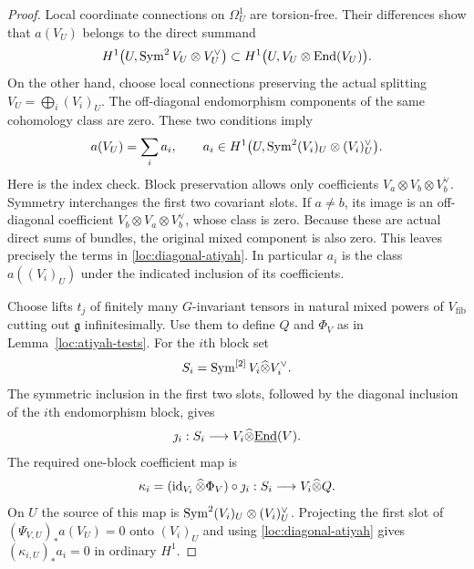 \begin{proof}
Local coordinate connections on $\Omega_U^1$ are torsion-free.
Their differences show that $a(V_U)$ belongs to the direct summand
\[
 H^1\bigl(U,\operatorname{Sym}^2V_U\otimes V_U^\vee\bigr)
       \subset H^1\bigl(U,V_U\otimes\operatorname{End}(V_U)\bigr).
\]
On the other hand, choose local connections preserving the actual
splitting $V_U=\bigoplus_i(V_i)_U$.  The off-diagonal
endomorphism components of the same cohomology class are zero.
These two conditions imply
\begin{equation}
 a(V_U)=\sum_i a_i,\qquad
 a_i\in H^1\bigl(U,\operatorname{Sym}^2(V_i)_U\otimes(V_i)_U^\vee\bigr).
 \label{loc:diagonal-atiyah}
\end{equation}
Here is the index check.  Block preservation allows only
coefficients $V_a\otimes V_b\otimes V_b^\vee$.  Symmetry
interchanges the first two covariant slots.  If $a\ne b$, its
image is an off-diagonal coefficient
$V_b\otimes V_a\otimes V_b^\vee$, whose class is zero.
Because these are actual direct sums of bundles, the original
mixed component is also zero.  This leaves precisely the terms in
\eqref{loc:diagonal-atiyah}.  In particular $a_i$ is the class
$a((V_i)_U)$ under the indicated inclusion of its coefficients.

Choose lifts $t_j$ of finitely many $G$-invariant tensors in natural
mixed powers of $V_{\mathrm{fib}}$ cutting out $\mathfrak g$
infinitesimally.  Use them to define $Q$ and $\Phi_V$ as in
Lemma~\ref{loc:atiyah-tests}.  For the $i$th block set
\[
 S_i=\operatorname{Sym}^{[2]}V_i\widehat\otimes V_i^\vee.
\]
The symmetric inclusion in the first two slots, followed by the
diagonal inclusion of the $i$th endomorphism block, gives
\[
 \jmath_i:S_i\longrightarrow
          V_i\widehat\otimes\underline{\operatorname{End}}(V).
\]
The required one-block coefficient map is
\begin{equation}\label{loc:kappa-coefficient}
 \kappa_i=(\operatorname{id}_{V_i}\widehat\otimes\Phi_V)\circ\jmath_i:
 S_i\longrightarrow V_i\widehat\otimes Q.
\end{equation}
On $U$ the source of this map is
$\operatorname{Sym}^2(V_i)_U\otimes(V_i)_U^\vee$.  Projecting the first slot of
$(\Psi_{V,U})_*a(V_U)=0$ onto $(V_i)_U$ and using
\eqref{loc:diagonal-atiyah} gives
$(\kappa_{i,U})_*a_i=0$ in ordinary $H^1$.


\end{proof}
